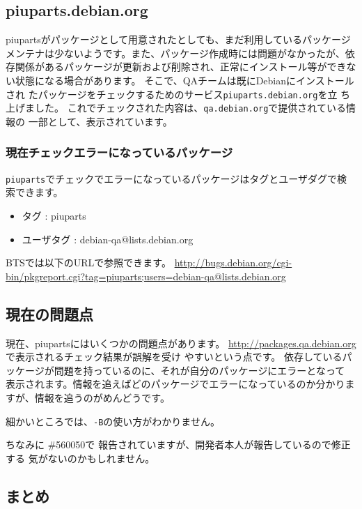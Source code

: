 \documentclass[mingoth,a4paper]{jsarticle}
\begin{document}
\subsection{piuparts.debian.org}
piupartsがパッケージとして用意されたとしても、まだ利用しているパッケージ
メンテナは少ないようです。また、パッケージ作成時には問題がなかったが、依
存関係があるパッケージが更新および削除され、正常にインストール等ができな
い状態になる場合があります。
そこで、QAチームは既にDebianにインストールされ
たパッケージをチェックするためのサービス\texttt{piuparts.debian.org}を立
ち上げました。
これでチェックされた内容は、\texttt{qa.debian.org}で提供されている情報の
一部として、表示されています。

\subsubsection{現在チェックエラーになっているパッケージ}

\texttt{piuparts}でチェックでエラーになっているパッケージはタグとユーザダグで検索できます。
\begin{itemize}
\item タグ : piuparts
\item ユーザタグ : debian-qa@lists.debian.org
\end{itemize}

BTSでは以下のURLで参照できます。
\url{http://bugs.debian.org/cgi-bin/pkgreport.cgi?tag=piuparts;users=debian-qa@lists.debian.org}

\subsection{現在の問題点}
現在、piupartsにはいくつかの問題点があります。
\url{http://packages.qa.debian.org}で表示されるチェック結果が誤解を受け
やすいという点です。
依存しているパッケージが問題を持っているのに、それが自分のパッケージにエラーとなって
表示されます。情報を追えばどのパッケージでエラーになっているのか分かりま
すが、情報を追うのがめんどうです。

細かいところでは、\texttt{-B}の使い方がわかりません。
ちなみに \#560050で 報告されていますが、開発者本人が報告しているので修正する
気がないのかもしれません。

\subsection{まとめ}
\end{document}
